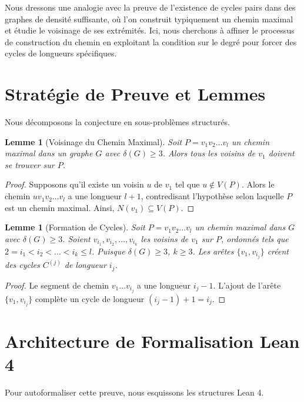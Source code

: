 \documentclass[11pt,a4paper]{article}
\newtheorem{lemma}[theorem]{Lemme}
\begin{document}
Nous dressons une analogie avec la preuve de l'existence de cycles pairs dans des graphes de densité suffisante, où l'on construit typiquement un chemin maximal et étudie le voisinage de ses extrémités. Ici, nous cherchons à affiner le processus de construction du chemin en exploitant la condition sur le degré pour forcer des cycles de longueurs spécifiques.

\section{Stratégie de Preuve et Lemmes}

Nous décomposons la conjecture en sous-problèmes structurés.

\begin{lemma}[Voisinage du Chemin Maximal]
\label{lem:longest_path}
Soit $P = v_1 v_2 \dots v_l$ un chemin maximal dans un graphe $G$ avec $\delta(G) \ge 3$. Alors tous les voisins de $v_1$ doivent se trouver sur $P$.
\end{lemma}

\begin{proof}
Supposons qu'il existe un voisin $u$ de $v_1$ tel que $u \notin V(P)$. Alors le chemin $u v_1 v_2 \dots v_l$ a une longueur $l+1$, contredisant l'hypothèse selon laquelle $P$ est un chemin maximal. Ainsi, $N(v_1) \subseteq V(P)$.
\end{proof}

\begin{lemma}[Formation de Cycles]
\label{lem:cycle_lengths}
Soit $P = v_1 v_2 \dots v_l$ un chemin maximal dans $G$ avec $\delta(G) \ge 3$. Soient $v_{i_1}, v_{i_2}, \dots, v_{i_k}$ les voisins de $v_1$ sur $P$, ordonnés tels que $2 = i_1 < i_2 < \dots < i_k \le l$. Puisque $\delta(G) \ge 3$, $k \ge 3$. Les arêtes $\{v_1, v_{i_j}\}$ créent des cycles $C^{(j)}$ de longueur $i_j$.
\end{lemma}

\begin{proof}
Le segment de chemin $v_1 \dots v_{i_j}$ a une longueur $i_j - 1$. L'ajout de l'arête $\{v_1, v_{i_j}\}$ complète un cycle de longueur $(i_j - 1) + 1 = i_j$.
\end{proof}

\section{Architecture de Formalisation Lean 4}
Pour autoformaliser cette preuve, nous esquissons les structures Lean 4.
\end{document}
